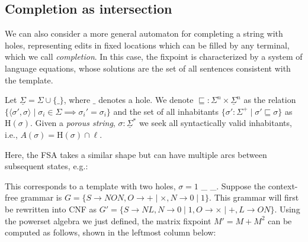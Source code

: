 \documentclass[sigplan,review,acmsmall,nonacm,screen,anonymous]{acmart}\settopmatter{printfolios=false,printccs=false,printacmref=false}
\begin{document}
\subsection{Completion as intersection}

We can also consider a more general automaton for completing a string with holes, representing edits in fixed locations which can be filled by any terminal, which we call \textit{completion}. In this case, the fixpoint is characterized by a system of language equations, whose solutions are the set of all sentences consistent with the template.

\begin{definition}[Completion]
  Let $\underline\Sigma = \Sigma \cup \{\_\}$, where $\_$ denotes a hole. We denote $\sqsubseteq: \Sigma^n \times \underline\Sigma^n$ as the relation $\{\langle\sigma', \sigma\rangle \mid \sigma_i \in \Sigma \implies \sigma_i' = \sigma_i\}$ and the set of all inhabitants $\{\sigma': \Sigma^+ \mid \sigma' \sqsubseteq \sigma\}$ as $\text{H}(\sigma)$. Given a \textit{porous string}, $\sigma: \underline\Sigma^*$ we seek all syntactically valid inhabitants, i.e., $A(\sigma)=\text{H}(\sigma)\cap\ell$.
\end{definition}

Here, the FSA takes a similar shape but can have multiple arcs between subsequent states, e.g.:

\begin{figure}[H]
\end{figure}

\noindent This corresponds to a template with two holes, $\sigma = 1$ \_ \_. Suppose the context-free grammar is $G=\{S\rightarrow N O N, O \rightarrow + \mid \times, N \rightarrow 0 \mid 1\}$. This grammar will first be rewritten into CNF as $G'= \{S \rightarrow N L, N \rightarrow 0 \mid 1, O \rightarrow \times \mid +, L \rightarrow O N\}$. Using the powerset algebra we just defined, the matrix fixpoint $M' = M + M^2$ can be computed as follows, shown in the leftmost column below:\vspace{0.3cm}
\end{document}
